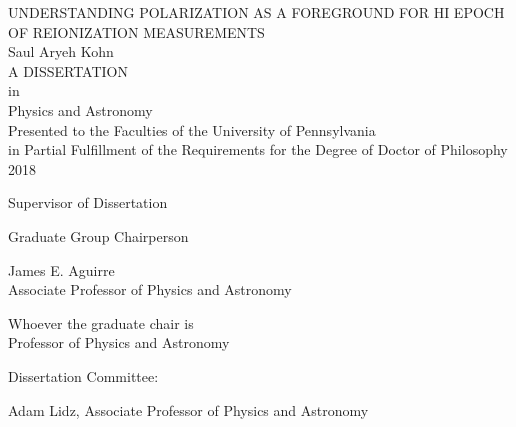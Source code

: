 \documentclass[12pt,twoside,openany]{book}
\newcommand{\doublespaced}{\renewcommand{\baselinestretch}{2}\normalfont}
\newcommand{\singlespaced}{\renewcommand{\baselinestretch}{1}\normalfont}
\newcommand{\halfspaced}{\renewcommand{\baselinestretch}{1.5}\normalfont}
\newcommand{\tita}{UNDERSTANDING POLARIZATION AS A FOREGROUND FOR HI EPOCH OF REIONIZATION MEASUREMENTS}
\begin{document}
\frontmatter
\doublespaced
\thispagestyle{empty}
\parskip=0.3in
\begin{center}
{\tita }\\

Saul Aryeh Kohn\\

A DISSERTATION\\

in\\ 

Physics and Astronomy\\

Presented to the Faculties of the University of Pennsylvania \\
in Partial Fulfillment of the Requirements for the Degree of Doctor of Philosophy\\

2018
\end{center}
\parskip=0in

\begin{multicols}{2}
\noindent Supervisor of Dissertation \\

\begin{flushright}
\noindent Graduate Group Chairperson\\
\end{flushright}

\end{multicols}

\noindent\makebox[0in][l]{\rule[2ex]{2.8in}{.3mm}} \hspace{3.05in} \makebox[0in][l]{\rule[2ex]{2.8in}{.3mm}} 
\vspace{-.5in}
\begin{multicols}{2}
\singlespaced
\noindent James E. Aguirre\\ \small Associate Professor of Physics and Astronomy\\

\normalsize

\begin{flushright}
Whoever the graduate chair is\\ \small Professor of Physics and Astronomy
\end{flushright}
\end{multicols}

\halfspaced
\noindent Dissertation Committee:

\noindent Adam Lidz, Associate Professor of Physics and Astronomy
\end{document}
